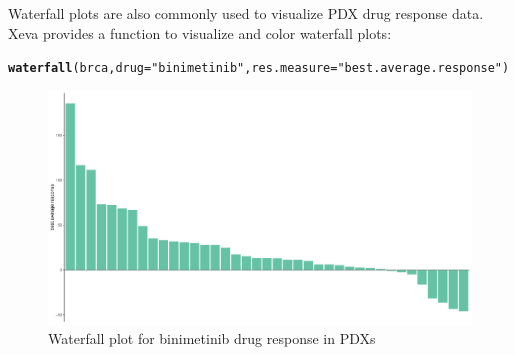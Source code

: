 \documentclass{article}\usepackage[]{graphicx}\usepackage[]{xcolor}
\makeatletter
\def\maxwidth{ %
  \ifdim\Gin@nat@width>\linewidth
    \linewidth
  \else
    \Gin@nat@width
  \fi
}
\newcommand{\hlstr}[1]{\textcolor[rgb]{0.192,0.494,0.8}{#1}}%
\newcommand{\hlstd}[1]{\textcolor[rgb]{0.345,0.345,0.345}{#1}}%
\newcommand{\hlkwc}[1]{\textcolor[rgb]{0.333,0.667,0.333}{#1}}%
\newcommand{\hlkwd}[1]{\textcolor[rgb]{0.737,0.353,0.396}{\textbf{#1}}}%
\newenvironment{kframe}{%
 \def\at@end@of@kframe{}%
 \ifinner\ifhmode%
  \def\at@end@of@kframe{\end{minipage}}%
  \begin{minipage}{\columnwidth}%
 \fi\fi%
 \def\FrameCommand##1{\hskip\@totalleftmargin \hskip-\fboxsep
 \colorbox{shadecolor}{##1}\hskip-\fboxsep
     \hskip-\linewidth \hskip-\@totalleftmargin \hskip\columnwidth}%
 \MakeFramed {\advance\hsize-\width
   \@totalleftmargin\z@ \linewidth\hsize
   \@setminipage}}%
 {\par\unskip\endMakeFramed%
 \at@end@of@kframe}
\newenvironment{knitrout}{}{} %
\makeatother
\begin{document}
Waterfall plots are also commonly used to visualize PDX drug response data.
Xeva provides a function to visualize and color waterfall plots:
\begin{knitrout}
\color{fgcolor}\begin{kframe}
\begin{alltt}
\hlkwd{waterfall}\hlstd{(brca,} \hlkwc{drug}\hlstd{=}\hlstr{"binimetinib"}\hlstd{,} \hlkwc{res.measure}\hlstd{=}\hlstr{"best.average.response"}\hlstd{)}
\end{alltt}
\end{kframe}\begin{figure}
\includegraphics[width=\maxwidth]{figure/waterFall1-1} \caption[Waterfall plot for binimetinib drug response in PDXs]{Waterfall plot for binimetinib drug response in PDXs}\label{fig:waterFall1}
\end{figure}

\end{knitrout}
\end{document}

